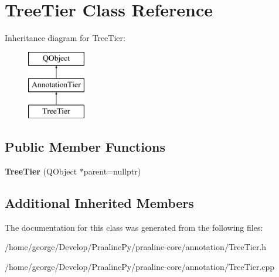 \hypertarget{class_tree_tier}{}\section{Tree\+Tier Class Reference}
\label{class_tree_tier}
Inheritance diagram for Tree\+Tier\+:\begin{figure}[H]
\begin{center}
\leavevmode
\includegraphics[height=3.000000cm]{class_tree_tier}
\end{center}
\end{figure}
\subsection*{Public Member Functions}
\begin{DoxyCompactItemize}
\item 
\mbox{\label{class_tree_tier_a04c3b80d4f67f2fd05f74acf72b1134d}} 
{\bfseries Tree\+Tier} (Q\+Object $\ast$parent=nullptr)
\end{DoxyCompactItemize}
\subsection*{Additional Inherited Members}


The documentation for this class was generated from the following files\+:\begin{DoxyCompactItemize}
\item 
/home/george/\+Develop/\+Praaline\+Py/praaline-\/core/annotation/Tree\+Tier.\+h\item 
/home/george/\+Develop/\+Praaline\+Py/praaline-\/core/annotation/Tree\+Tier.\+cpp\end{DoxyCompactItemize}
